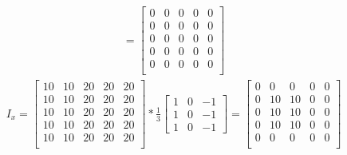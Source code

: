 \documentclass[letterpaper,12pt]{article}
\begin{document}
\begin{itemize}
\begin{align}
        = \begin{bmatrix}
         0 & 0 & 0 & 0 & 0 \\
         0 & 0 & 0 & 0 & 0 \\
         0 & 0 & 0 & 0 & 0 \\
         0 & 0 & 0 & 0 & 0 \\
         0 & 0 & 0 & 0 & 0 \\
        \end{bmatrix}
       \end{align}
       \begin{align}
        I_x =
        \begin{bmatrix}
         10 & 10 & 20 & 20 & 20 \\
         10 & 10 & 20 & 20 & 20 \\
         10 & 10 & 20 & 20 & 20 \\
         10 & 10 & 20 & 20 & 20 \\
         10 & 10 & 20 & 20 & 20 \\
        \end{bmatrix}
        * \frac{1}{3}\begin{bmatrix}
         1 & 0 & -1 \\
         1 & 0 & -1 \\
         1 & 0 & -1
        \end{bmatrix}
        = \begin{bmatrix}
         0 & 0  & 0  & 0 & 0 \\
         0 & 10 & 10 & 0 & 0 \\
         0 & 10 & 10 & 0 & 0 \\
         0 & 10 & 10 & 0 & 0 \\
         0 & 0  & 0  & 0 & 0 \\
        \end{bmatrix}
       \end{align}
\end{itemize}
\end{document}
